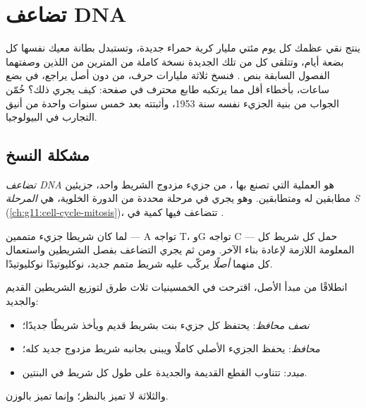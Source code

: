 \chapter{تضاعف DNA}\label{ch:g11:dna-replication}

ينتج نقي عظمك كل يوم مئتي مليار كرية حمراء جديدة، وتستبدل بطانة معيك
نفسها كل بضعة أيام، وتتلقى كل  من تلك  الجديدة نسخة كاملة
من المترين من  اللذين وصفتهما الفصول السابقة بنص . فنسخ ثلاثة
مليارات حرف، من دون أصل يراجع، في بضع ساعات، بأخطاء أقل مما يرتكبه
طابع محترف في صفحة: كيف يجري ذلك؟ خُمّن الجواب من بنية الجزيء نفسه سنة
1953، وأثبتته بعد خمس سنوات واحدة من أنيق التجارب في البيولوجيا.

\section{مشكلة النسخ}

\begin{definition}[التضاعف]\label{def:g11:dna-replication:replication}
\emph{تضاعف DNA} هو العملية التي تصنع بها ، من
جزيء  مزدوج الشريط واحد، جزيئين مطابقين له ومتطابقين. وهو يجري في
مرحلة محددة من الدورة الخلوية، هي \emph{المرحلة S}
(\cref{ch:g11:cell-cycle-mitosis})، تتضاعف فيها كمية  في .
\end{definition}

\begin{proposition}\label{prop:g11:dna-replication:template}
لما كان شريطا جزيء  متممين --- A تواجه T، وG تواجه C --- حمل كل
شريط كل المعلومة اللازمة لإعادة بناء الآخر. ومن ثم يجري التضاعف بفصل
الشريطين واستعمال كل منهما \emph{أصلًا} يركّب عليه شريط متمم جديد،
نوكليوتيدًا نوكليوتيدًا.
\end{proposition}
\admitted

\begin{example}\label{ex:g11:dna-replication:models}
انطلاقًا من مبدأ الأصل، اقترحت في الخمسينيات ثلاث طرق لتوزيع الشريطين
القديم والجديد:
\begin{itemize}
  \item \emph{نصف محافظ}: يحتفظ كل جزيء بنت بشريط قديم ويأخذ شريطًا
        جديدًا؛
  \item \emph{محافظ}: يحفظ الجزيء الأصلي كاملًا ويبنى بجانبه شريط
        مزدوج جديد كله؛
  \item \emph{مبدد}: تتناوب القطع القديمة والجديدة على طول كل شريط في
        البنتين.
\end{itemize}
والثلاثة لا تميز بالنظر؛ وإنما تميز بالوزن.
\end{example}

